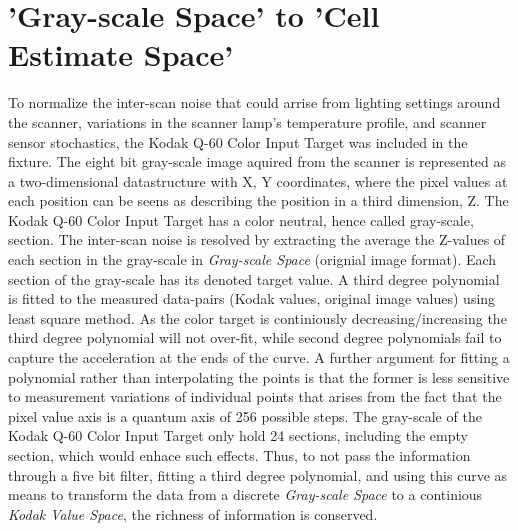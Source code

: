 \documentclass{article}
\begin{document}
\section{'Gray-scale Space' to 'Cell Estimate Space'}
To normalize the inter-scan noise that could arrise from lighting settings
around the scanner, variations in the scanner lamp's temperature profile, and
scanner sensor stochastics, the Kodak Q-60 Color Input Target was included
in the fixture.
The eight bit gray-scale image aquired from the scanner is represented as a 
two-dimensional datastructure with X, Y coordinates, where the pixel values 
at each position can be seens as describing the position in a third dimension,
Z. 
The Kodak Q-60 Color Input Target has a color neutral, hence called gray-scale,
section. 
The inter-scan noise is resolved by extracting the average the Z-values of each
section in the gray-scale in \emph{Gray-scale Space} (orignial image format).
Each section of the gray-scale has its denoted target value.
A third degree polynomial is fitted to the measured data-pairs (Kodak values,
original image values) using least square method.
As the color target is continiously decreasing/increasing the third degree
polynomial will not over-fit, while second degree polynomials fail to capture
the acceleration at the ends of the curve.
A further argument for fitting a polynomial rather than interpolating the 
points is that the former is less sensitive to measurement variations of 
individual points that arises from the fact that the pixel value axis is a
quantum axis of 256 possible steps.
The gray-scale of the Kodak Q-60 Color Input Target only hold 24 sections,
including the empty section, which would enhace such effects.
Thus, to not pass the information through a five bit filter, fitting a 
third degree polynomial, and using this curve as means to transform the
data from a discrete \emph{Gray-scale Space} to a continious 
\emph{Kodak Value Space}, the richness of information is conserved.
\end{document}
